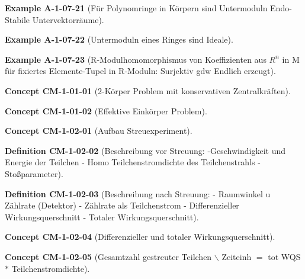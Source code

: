 \documentclass[10pt, letterpaper]{article}
\newcommand{\CustomHeading}[3]{%
  \par\medskip\noindent%
  \textbf{#1 #2} \textnormal{(#3)}.\enskip%
}
\newenvironment{DEF}[2]{\CustomHeading{Definition}{#1}{#2}}{}
\newenvironment{EXA}[2]{\CustomHeading{Example}{#1}{#2}}{}
\newenvironment{CONC}[2]{\CustomHeading{Concept}{#1}{#2}}{}
\begin{document}
\begin{EXA}{A-1-07-21}{Für Polynomringe in Körpern sind Untermoduln Endo-Stabile Untervektorräume}
\end{EXA}

\begin{EXA}{A-1-07-22}{Untermoduln eines Ringes sind Ideale}
\end{EXA}

\begin{EXA}{A-1-07-23}{R-Modulhomomorphismus von Koeffizienten aus $R^n$ in M für fixiertes Elemente-Tupel in R-Moduln: Surjektiv gdw Endlich erzeugt}
\end{EXA}

\begin{CONC}{CM-1-01-01}{2-Körper Problem mit konservativen Zentralkräften}
\end{CONC}

\begin{CONC}{CM-1-01-02}{Effektive Einkörper Problem}
\end{CONC}

\begin{CONC}{CM-1-02-01}{Aufbau Streuexperiment}
\end{CONC}

\begin{DEF}{CM-1-02-02}{Beschreibung vor Streuung:
-Geschwindigkeit und Energie der Teilchen
- Homo Teilchenstromdichte des Teilchenstrahls
- Stoßparameter}
\end{DEF}

\begin{DEF}{CM-1-02-03}{Beschreibung nach Streuung:
- Raumwinkel u Zählrate (Detektor)
- Zählrate als Teilchenstrom
- Differenzieller Wirkungsquerschnitt
- Totaler Wirkungsquerschnitt}
\end{DEF}

\begin{CONC}{CM-1-02-04}{Differenzieller und totaler Wirkungsquerschnitt}
\end{CONC}

\begin{CONC}{CM-1-02-05}{Gesamtzahl gestreuter Teilchen $\backslash$ Zeiteinh $=$ tot WQS $*$ Teilchenstromdichte}
\end{CONC}
\end{document}
